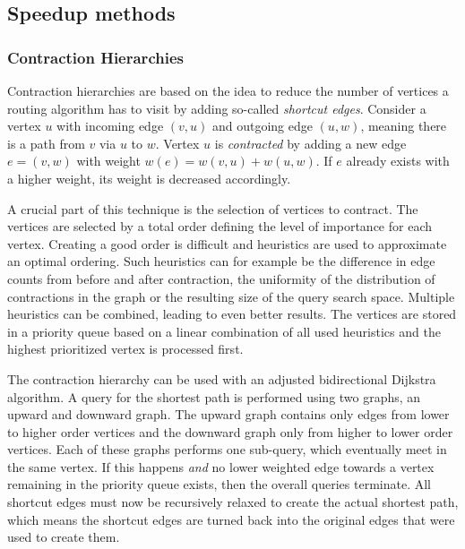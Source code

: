 	\subsection{Speedup methods}
	\label{subsec:speedup-methods}
		
		\subsubsection{Contraction Hierarchies}
		\label{subsubsec:ch}
		
			Contraction hierarchies are based on the idea to reduce the number of vertices a routing algorithm has to visit by adding so-called \emph{shortcut edges}\cite{geisberger-contraction-hierarchies}.
			Consider a vertex $u$ with incoming edge $(v, u)$ and outgoing edge $(u, w)$, meaning there is a path from $v$ via $u$ to $w$.
			Vertex $u$ is \emph{contracted} by adding a new edge $e = (v, w)$ with weight $w(e) = w(v, u) + w(u, w)$.
			If $e$ already exists with a higher weight, its weight is decreased accordingly.
			
			A crucial part of this technique is the selection of vertices to contract\cite[14]{geisberger-contraction-hierarchies}.
			The vertices are selected by a total order defining the level of importance for each vertex.
			Creating a good order is difficult and heuristics are used to approximate an optimal ordering.
			Such heuristics can for example be the difference in edge counts from before and after contraction, the uniformity of the distribution of contractions in the graph or the resulting size of the query search space.
			Multiple heuristics can be combined, leading to even better results\cite[49]{geisberger-contraction-hierarchies}.
			The vertices are stored in a priority queue based on a linear combination of all used heuristics and the highest prioritized vertex is processed first.
			
			The contraction hierarchy can be used with an adjusted bidirectional Dijkstra algorithm\cite[29-30]{geisberger-contraction-hierarchies}.
			A query for the shortest path is performed using two graphs, an upward and downward graph.
			The upward graph contains only edges from lower to higher order vertices and the downward graph only from higher to lower order vertices.
			Each of these graphs performs one sub-query, which eventually meet in the same vertex.
			If this happens \emph{and} no lower weighted edge towards a vertex remaining in the priority queue exists, then the overall queries terminate.
			All shortcut edges must now be recursively relaxed to create the actual shortest path, which means the shortcut edges are turned back into the original edges that were used to create them.
		
